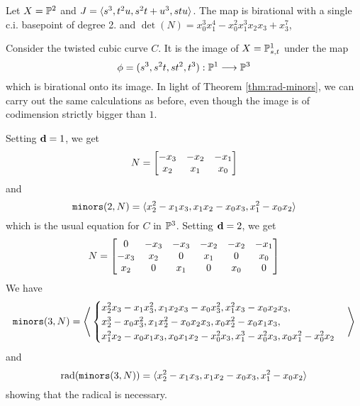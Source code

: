 \documentclass[fleqn,reqno]{amsart}
\begin{document}
\begin{example}[$\mt{ex306}$]
\label{ex306}
Let $X=\mathbb{P}^2$ and $J=\langle s^3,t^2u,s^2t+u^3,stu\rangle$.
The map is birational with a single c.i. basepoint of degree 2.
and $\det(N)={x}_{0}^{3} {x}_{1}^{4}-{x}_{0}^{2} {x}_{1}^{3} {x}_{2} {x}_{3}+{x}_{3}^{7}$,
\end{example}

\begin{example}[$\mt{ex307}$]
\label{ex307}
Consider the twisted cubic curve $C$.
It is the image of $X=\mathbb{P}^1_{s,t}$ under the map
\[
	\phi=(s^3,s^2t,st^2,t^3):\mathbb{P}^1\longrightarrow\mathbb{P}^3
\]
which is birational onto its image.
In light of Theorem \ref{thm:rad-minors}, we can carry out the same calculations
as before, even though the image is of codimension strictly bigger than $1$.

Setting $\mathbf d=1$, we get
\[
	N=
	\bgroup\begin{bmatrix}{-{x}_{3}}&
      {-{x}_{2}}&
      {-{x}_{1}}\\
      {x}_{2}&
      {x}_{1}&
      {x}_{0}\\
      \end{bmatrix}\egroup
\]
and
\[
	\mathop{\tt minors}(2,N)=\langle {x}_{2}^{2}-{x}_{1} {x}_{3},{x}_{1} {x}_{2}-{x}_{0}
      {x}_{3},{x}_{1}^{2}-{x}_{0} {x}_{2}\rangle
\]
which is the usual equation for $C$ in $\mathbb{P}^3$. Setting $\mathbf d=2$, we get
\[
	N=
	\bgroup\begin{bmatrix}0&
      {-{x}_{3}}&
      {-{x}_{3}}&
      {-{x}_{2}}&
      {-{x}_{2}}&
      {-{x}_{1}}\\
      {-{x}_{3}}&
      {x}_{2}&
      0&
      {x}_{1}&
      0&
      {x}_{0}\\
      {x}_{2}&
      0&
      {x}_{1}&
      0&
      {x}_{0}&
      0\\
      \end{bmatrix}\egroup
\]
We have
\[
	\mathop{\tt minors}(3,N)=\Bigg\langle
	\begin{cases}
	{x}_{2}^{2} {x}_{3}-{x}_{1} {x}_{3}^{2},
	{x}_{1} {x}_{2} {x}_{3}-{x}_{0}{x}_{3}^{2},
	{x}_{1}^{2} {x}_{3}-{x}_{0} {x}_{2} {x}_{3},\\
	{x}_{2}^{3}-{x}_{0}{x}_{3}^{2},
	{x}_{1} {x}_{2}^{2}-{x}_{0} {x}_{2} {x}_{3},
	{x}_{0}{x}_{2}^{2}-{x}_{0} {x}_{1} {x}_{3},\\
	{x}_{1}^{2} {x}_{2}-{x}_{0} {x}_{1}{x}_{3},
	{x}_{0} {x}_{1} {x}_{2}-{x}_{0}^{2} {x}_{3},
	{x}_{1}^{3}-{x}_{0}^{2}{x}_{3},{x}_{0} {x}_{1}^{2}-{x}_{0}^{2} {x}_{2}
	\end{cases}
	\Bigg\rangle
\]
and
\[
	\operatorname{rad}(\mathop{\tt minors}(3,N))=
	\langle {x}_{2}^{2}-{x}_{1} {x}_{3},{x}_{1} {x}_{2}-{x}_{0}
	      {x}_{3},{x}_{1}^{2}-{x}_{0} {x}_{2}\rangle
\]
showing that the radical is necessary.
\end{example}
\end{document}
